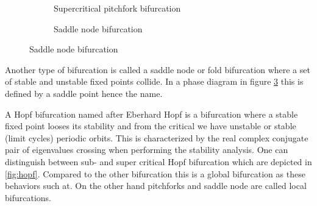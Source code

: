 \begin{figure}[ht]
\centering
  \begin{subfigure}[t]{0.3\textwidth}
    \centering
    \caption{Supercritical pitchfork bifurcation}
    \label{fig:pitchfork}
  \end{subfigure}
  \hspace{0.1\textwidth}
  \begin{subfigure}[t]{0.3\textwidth}
    \centering
    \caption{Saddle node bifurcation}
    \label{fig:saddlenode}
  \end{subfigure}
\end{figure}

Another type of bifurcation is called a saddle node or fold bifurcation where a
set of stable and unstable fixed points collide. In a phase diagram in figure
\ref{fig:saddlenode} this is defined by a saddle point hence the name.

A Hopf bifurcation named after Eberhard Hopf is a bifurcation where a stable
fixed point looses its stability and from the critical we have unstable or
stable (limit cycles) periodic orbits. This is characterized by the real
complex conjugate pair of eigenvalues crossing when performing the stability
analysis. One can distinguish between sub- and super critical Hopf bifurcation
which are depicted in \ref{fig:hopf}. Compared to the other bifurcation this is
a global bifurcation as these behaviors such at. On the other hand pitchforks
and saddle node are called local bifurcations.

